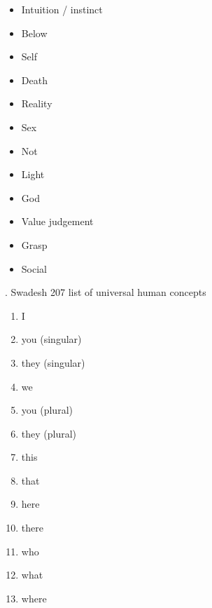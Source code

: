 \begin{multicols}{2}
\begin{itemize}
\item   Intuition / instinct 

\item   Below 

\item   Self 

\item   Death 

\item   Reality 

\item   Sex 

\item   Not 

\item   Light 

\item   God 

\item   Value judgement  

\item   Grasp 

\item   Social  
\end{itemize}

. Swadesh 207 list of universal human concepts 

\begin{enumerate}
\item   I 

\item   you (singular) 

\item   they (singular) 

\item   we 

\item   you (plural) 

\item   they (plural) 

\item   this 

\item   that 

\item   here 

\item   there 

\item   who 

\item   what 

\item   where 


\end{enumerate}
\end{multicols}
